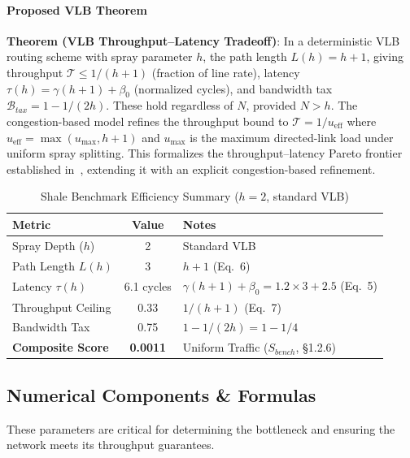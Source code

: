 \documentclass{article}
\begin{document}
    \paragraph{Proposed VLB Theorem}
    \textbf{Theorem (VLB Throughput--Latency Tradeoff)}: In a deterministic VLB routing scheme with spray parameter $h$, the path length $L(h) = h + 1$, giving throughput $\mathcal{T} \leq 1/(h{+}1)$ (fraction of line rate), latency $\tau(h) = \gamma(h{+}1) + \beta_0$ (normalized cycles), and bandwidth tax $\mathcal{B}_{tax} = 1 - 1/(2h)$. These hold regardless of $N$, provided $N > h$. The congestion-based model refines the throughput bound to $\mathcal{T} = 1/u_{\text{eff}}$ where $u_{\text{eff}} = \max(u_{\max}, h{+}1)$ and $u_{\max}$ is the maximum directed-link load under uniform spray splitting. This formalizes the throughput--latency Pareto frontier established in~\cite{shale}, extending it with an explicit congestion-based refinement.

    \begin{table}[H]
        \centering
        \caption{Shale Benchmark Efficiency Summary ($h=2$, standard VLB)}
        \begin{tabular}{|l|c|l|}
            \hline
            \textbf{Metric} & \textbf{Value} & \textbf{Notes} \\
            \hline
            Spray Depth ($h$) & 2 & Standard VLB \\
            Path Length $L(h)$ & 3 & $h+1$ (Eq.~6) \\
            Latency $\tau(h)$ & 6.1 cycles & $\gamma(h{+}1) + \beta_0 = 1.2 \times 3 + 2.5$ (Eq.~5) \\
            Throughput Ceiling & 0.33 & $1/(h+1)$ (Eq.~7) \\
            Bandwidth Tax & 0.75 & $1 - 1/(2h) = 1 - 1/4$ \\
            \textbf{Composite Score} & \textbf{0.0011} & Uniform Traffic ($S_{bench}$, \S1.2.6) \\
            \hline
        \end{tabular}
        \label{tab:shale_efficiency}
    \end{table}

    \subsection{Numerical Components \& Formulas}
    These parameters are critical for determining the bottleneck and ensuring the network meets its throughput guarantees.
\end{document}

